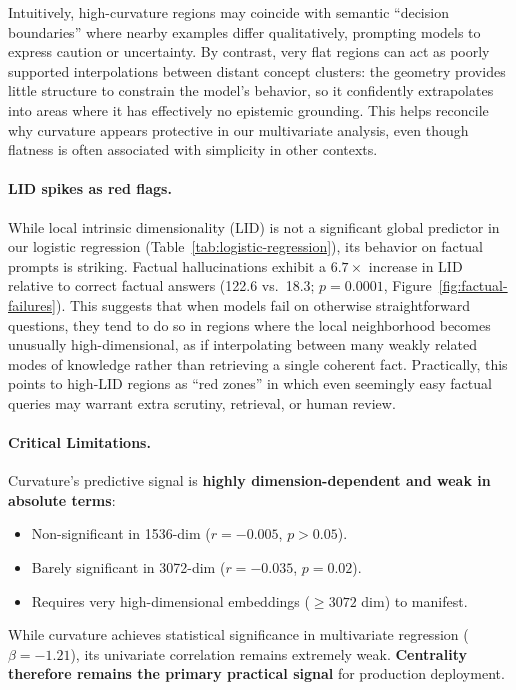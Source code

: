 \documentclass{article}
\begin{document}
Intuitively, high-curvature regions may coincide with semantic ``decision boundaries'' where nearby examples differ qualitatively, prompting models to express caution or uncertainty. By contrast, very flat regions can act as poorly supported interpolations between distant concept clusters: the geometry provides little structure to constrain the model’s behavior, so it confidently extrapolates into areas where it has effectively no epistemic grounding. This helps reconcile why curvature appears protective in our multivariate analysis, even though flatness is often associated with simplicity in other contexts.
\paragraph{LID spikes as red flags.}
While local intrinsic dimensionality (LID) is not a significant global predictor in our logistic regression (Table~\ref{tab:logistic-regression}), its behavior on factual prompts is striking. Factual hallucinations exhibit a $6.7\times$ increase in LID relative to correct factual answers (122.6 vs.\ 18.3; $p=0.0001$, Figure~\ref{fig:factual-failures}). This suggests that when models fail on otherwise straightforward questions, they tend to do so in regions where the local neighborhood becomes unusually high-dimensional, as if interpolating between many weakly related modes of knowledge rather than retrieving a single coherent fact. Practically, this points to high-LID regions as ``red zones'' in which even seemingly easy factual queries may warrant extra scrutiny, retrieval, or human review.
\paragraph{Critical Limitations.}
Curvature's predictive signal is \textbf{highly dimension-dependent and weak in absolute terms}:
\begin{itemize}
    \item Non-significant in 1536-dim ($r=-0.005$, $p>0.05$).
    \item Barely significant in 3072-dim ($r=-0.035$, $p=0.02$).
    \item Requires very high-dimensional embeddings ($\geq 3072$ dim) to manifest.
\end{itemize}
While curvature achieves statistical significance in multivariate regression ($\beta=-1.21$), its univariate correlation remains extremely weak. \textbf{Centrality therefore remains the primary practical signal} for production deployment.
\end{document}
